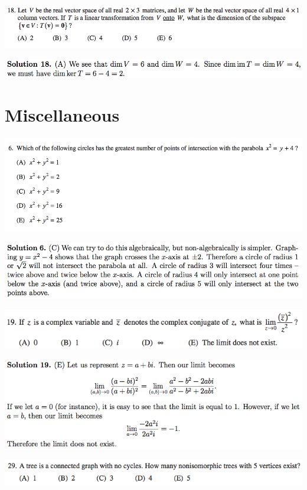 \documentclass{article}
\begin{document}
\includegraphics[scale=0.5]{0568_18}

\includegraphics[scale=0.5]{0568_18s}

\pagebreak

\section{Miscellaneous}

\includegraphics[scale=0.5]{0568_6}

\includegraphics[scale=0.5]{0568_6s}

\includegraphics[scale=0.65]{1268_19}

\includegraphics[scale=0.65]{1268_19s}

\includegraphics[scale=0.65]{1268_28}
\end{document}
